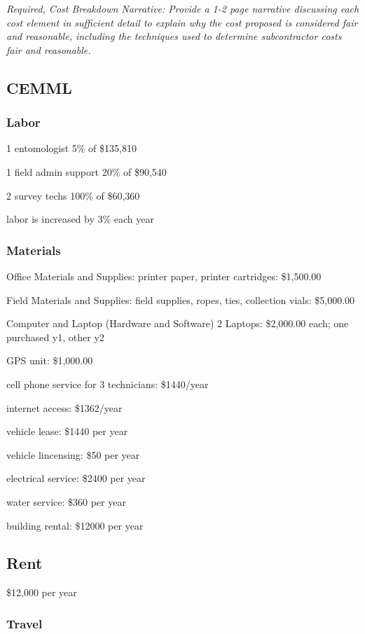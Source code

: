 \documentclass[11pt,english,letterpaper]{scrartcl}
\begin{document}
\textit{Required, Cost Breakdown Narrative: Provide a 1-2 page narrative discussing each
cost element in sufficient detail to explain why the cost proposed is considered fair and
reasonable, including the techniques used to determine subcontractor costs fair and
reasonable.}

\subsection{CEMML}

\subsubsection{Labor}

1 entomologist 5\% of \$135,810

1 field admin support 20\% of \$90,540

2 survey techs 100\% of \$60,360

labor is increased by 3\% each year

\subsubsection{Materials}

Office Materials and Supplies: printer paper, printer cartridges: \$1,500.00

Field Materials and Supplies: field supplies, ropes, ties, collection vials: \$5,000.00

Computer and Laptop (Hardware and Software) 2 Laptops: \$2,000.00 each; one purchased y1, other y2

GPS unit: \$1,000.00

cell phone service for 3 technicians: \$1440/year

internet access: \$1362/year

vehicle lease: \$1440 per year

vehicle lincensing: \$50 per year

electrical service: \$2400 per year

water service: \$360 per year

building rental: \$12000 per year

\subsection{Rent}

\$12,000 per year

\subsubsection{Travel}
\end{document}
